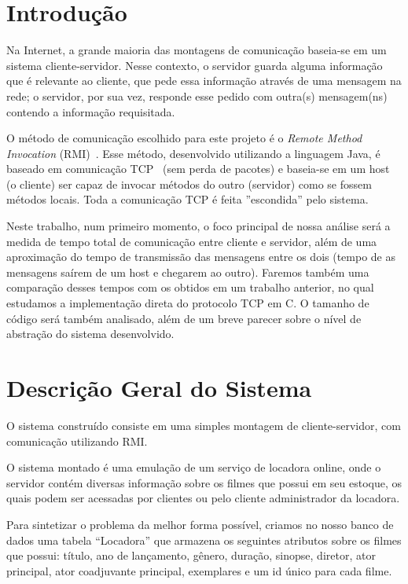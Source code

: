 \documentclass[12pt,a4paper]{article}
\begin{document}
\section{Introdução}
Na Internet, a grande maioria das montagens de comunicação baseia-se em um sistema cliente-servidor. Nesse contexto, o servidor guarda alguma informação que é relevante ao cliente, que pede essa informação através de uma mensagem na rede; o servidor, por sua vez, responde esse pedido com outra(s) mensagem(ns) contendo a informação requisitada.

O método de comunicação escolhido para este projeto é o {\it Remote Method Invocation} (RMI)~\cite{downing1998java, RMITutorial}. Esse método, desenvolvido utilizando a linguagem Java, é baseado em comunicação TCP~\cite{postel1981transmission} (sem perda de pacotes) e baseia-se em um host (o cliente) ser capaz de invocar métodos do outro (servidor) como se fossem métodos locais. Toda a comunicação TCP é feita ''escondida'' pelo sistema.

Neste trabalho, num primeiro momento, o foco principal de nossa análise será a medida de tempo total de comunicação entre cliente e servidor, além de uma aproximação do tempo de transmissão das mensagens entre os dois (tempo de as mensagens saírem de um host e chegarem ao outro). Faremos também uma comparação desses tempos com os obtidos em um trabalho anterior, no qual estudamos a implementação direta do protocolo TCP em C. O tamanho de código será também analisado, além de um breve parecer sobre o nível de abstração do sistema desenvolvido.

\section{Descrição Geral do Sistema}

O sistema construído consiste em uma simples montagem de cliente-servidor, com comunicação utilizando RMI. 

    O sistema montado é uma emulação de um serviço de locadora online, onde o servidor contém diversas informação sobre os filmes que possui em seu estoque, os quais podem ser acessadas por clientes ou pelo cliente administrador da locadora. 
    
    Para sintetizar o problema da melhor forma possível, criamos no nosso banco de dados uma tabela “Locadora” que armazena os seguintes atributos sobre os filmes que possui: título, ano de lançamento, gênero, duração, sinopse, diretor, ator principal, ator coadjuvante principal, exemplares e um id único para cada filme. 
    
\end{document}
